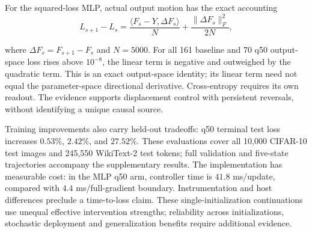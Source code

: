 \begin{samepage}
For the squared-loss MLP, actual output motion has the exact accounting
\begin{equation}
 L_{s+1}-L_s=\frac{\langle F_s-Y,\Delta F_s\rangle}{N}
             +\frac{\|\Delta F_s\|_F^2}{2N},
 \label{eq:vc-output-loss}
\end{equation}
\end{samepage}
where $\Delta F_s=F_{s+1}-F_s$ and $N=5000$. For all 161 baseline and
70 q50 output-space loss rises above $10^{-8}$, the linear term is negative
and outweighed by the quadratic term. This is an exact output-space identity;
its linear term need not equal the parameter-space directional derivative.
Cross-entropy requires its own readout. The evidence supports displacement
control with persistent reversals, without identifying a unique causal source.

Training improvements also carry held-out tradeoffs: q50 terminal test loss
increases $0.53\%$, $2.42\%$, and $27.52\%$. These evaluations cover all 10,000
CIFAR-10 test images and 245,550 WikiText-2 test tokens; full validation and
five-state trajectories accompany the supplementary results. The implementation
has measurable cost: in the MLP q50 arm, controller time is $41.8$ ms/update,
compared with $4.4$ ms/full-gradient boundary. Instrumentation and host differences
preclude a time-to-loss claim. These single-initialization continuations use
unequal effective intervention strengths; reliability across initializations,
stochastic deployment and generalization benefits require additional evidence.
